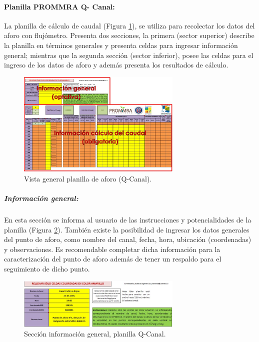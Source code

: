 \documentclass[]{article}
\begin{document}
\paragraph{Planilla PROMMRA Q- Canal:} La planilla de cálculo de caudal (Figura \ref{q_canal}), se utiliza para recolectar los datos del aforo con flujómetro. Presenta dos secciones, la primera (sector superior) describe la planilla en términos generales y presenta celdas para ingresar información general; mientras que la segunda sección (sector inferior), posee las celdas para el ingreso de los datos de aforo y además presenta los resultados de cálculo.

\begin{figure}[H]
\centering
\includegraphics[width=0.7\textwidth]{images/planilla_qcanal.eps}
\caption{Vista general planilla de aforo (Q-Canal).}
\label{q_canal}
\end{figure}

\subparagraph{Información general:}
En esta sección se informa al usuario de las instrucciones y potencialidades de la planilla (Figura \ref{info_general}). También existe la posibilidad de ingresar los datos generales del punto de aforo, como nombre del canal, fecha, hora, ubicación (coordenadas) y observaciones. Es recomendable completar dicha información para la caracterización del punto de aforo además de tener un respaldo para el seguimiento de dicho punto.

\begin{figure}[H]
\centering
\includegraphics[width=0.7\textwidth]{images/info_general.eps}
\caption{Sección información general, planilla Q-Canal.}
\label{info_general}
\end{figure}
\end{document}
